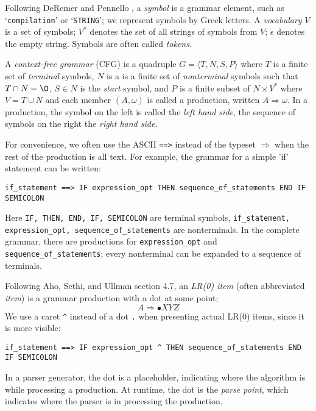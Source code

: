 \documentclass[authordraft]{acmart}
\newcommand{\code}[1]{`\lstinline|#1|'}
\begin{document}
Following DeRemer and Pennello \citep{DeRemer_1982}, a {\it symbol} is
a grammar element, such as \code{compilation} or \code{STRING}; we
represent symbols by Greek letters. A {\it vocabulary} $V$ is a set of
symbols; $V^*$ denotes the set of all strings of symbols from $V$;
$\epsilon$ denotes the empty string. Symbols are often called {\it
  tokens}.

A {\it context-free grammar} (CFG) is a quadruple
$G = \langle T, N, S, P \rangle$ where $T$ is a finite set of {\it terminal} symbols, $N$
is a is a finite set of {\it nonterminal} symbols such that
$T \cap N = \O$, $S \in N$ is the {\it start} symbol, and $P$ is a finite subset
of $N \times V^*$ where $V = T \cup N$ and each member $(A, \omega)$
is called a production, written $A \Rightarrow \omega$. In a
production, the symbol on the left is called the {\it left hand side},
the sequence of symbols on the right the {\it right hand side}.

For convenience, we often use the ASCII \verb|==>| instead of the
typeset $\Rightarrow$ when the rest of the production is all text. For
example, the grammar for a simple 'if' statement can be written:
\begin{verbatim}
if_statement ==> IF expression_opt THEN sequence_of_statements END IF SEMICOLON
\end{verbatim}
Here \verb|IF, THEN, END, IF, SEMICOLON| are terminal symbols,
\verb|if_statement, expression_opt, sequence_of_statements| are
nonterminals. In the complete grammar, there are productions for
\verb|expression_opt| and \verb|sequence_of_statements|; every
nonterminal can be expanded to a sequence of terminals.

Following Aho, Sethi, and Ullman \citep{dragon} section 4.7, an {\it
  LR(0) item} (often abbreviated {\it item}) is a grammar production
with a dot at some point;
\begin{displaymath}
  A \Rightarrow \bullet X Y Z
\end{displaymath}
We use a caret \verb|^| instead of a dot \verb|.| when presenting
actual LR(0) items, since it is more visible:
\begin{verbatim}
if_statement ==> IF expression_opt ^ THEN sequence_of_statements END IF SEMICOLON
\end{verbatim}

In a parser generator, the dot is a placeholder, indicating where the
algorithm is while processing a production. At runtime, the dot is the
{\it parse point}, which indicates where the parser is in processing
the production.
\end{document}
